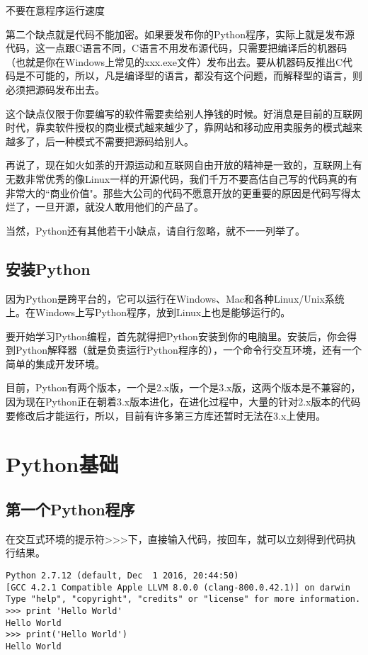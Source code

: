 不要在意程序运行速度

第二个缺点就是代码不能加密。如果要发布你的Python程序，实际上就是发布源代码，这一点跟C语言不同，C语言不用发布源代码，只需要把编译后的机器码（也就是你在Windows上常见的xxx.exe文件）发布出去。要从机器码反推出C代码是不可能的，所以，凡是编译型的语言，都没有这个问题，而解释型的语言，则必须把源码发布出去。

这个缺点仅限于你要编写的软件需要卖给别人挣钱的时候。好消息是目前的互联网时代，靠卖软件授权的商业模式越来越少了，靠网站和移动应用卖服务的模式越来越多了，后一种模式不需要把源码给别人。

再说了，现在如火如荼的开源运动和互联网自由开放的精神是一致的，互联网上有无数非常优秀的像Linux一样的开源代码，我们千万不要高估自己写的代码真的有非常大的``商业价值"。那些大公司的代码不愿意开放的更重要的原因是代码写得太烂了，一旦开源，就没人敢用他们的产品了。

当然，Python还有其他若干小缺点，请自行忽略，就不一一列举了。

\subsection{安装Python}
因为Python是跨平台的，它可以运行在Windows、Mac和各种Linux/Unix系统上。在Windows上写Python程序，放到Linux上也是能够运行的。

要开始学习Python编程，首先就得把Python安装到你的电脑里。安装后，你会得到Python解释器（就是负责运行Python程序的），一个命令行交互环境，还有一个简单的集成开发环境。

目前，Python有两个版本，一个是2.x版，一个是3.x版，这两个版本是不兼容的，因为现在Python正在朝着3.x版本进化，在进化过程中，大量的针对2.x版本的代码要修改后才能运行，所以，目前有许多第三方库还暂时无法在3.x上使用。

\section{Python基础}
\subsection{第一个Python程序}
在交互式环境的提示符>>>下，直接输入代码，按回车，就可以立刻得到代码执行结果。
\begin{verbatim}
Python 2.7.12 (default, Dec  1 2016, 20:44:50) 
[GCC 4.2.1 Compatible Apple LLVM 8.0.0 (clang-800.0.42.1)] on darwin
Type "help", "copyright", "credits" or "license" for more information.
>>> print 'Hello World'
Hello World
>>> print('Hello World')
Hello World
\end{verbatim}

